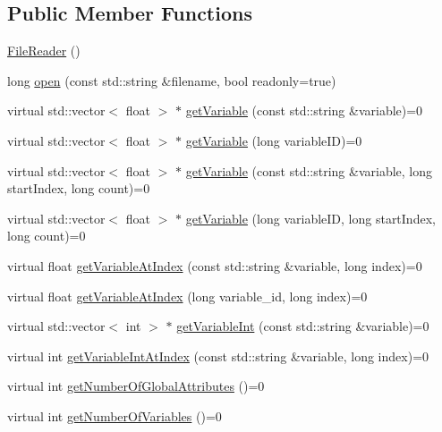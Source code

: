 \subsection*{Public Member Functions}
\begin{DoxyCompactItemize}
\item 
\hyperlink{classccmc_1_1_file_reader_a8d7df2b31965866393a4225e0955fcac}{File\-Reader} ()
\item 
long \hyperlink{classccmc_1_1_file_reader_aa7a02a3f99c09861a5e7c00e98b81be2}{open} (const std\-::string \&filename, bool readonly=true)
\item 
virtual std\-::vector$<$ float $>$ $\ast$ \hyperlink{classccmc_1_1_file_reader_a3703180de2d7d38c1ccf115d5279d4d0}{get\-Variable} (const std\-::string \&variable)=0
\item 
virtual std\-::vector$<$ float $>$ $\ast$ \hyperlink{classccmc_1_1_file_reader_a47fafa0e59e4d5f379a48b3d0b1add6e}{get\-Variable} (long variable\-I\-D)=0
\item 
virtual std\-::vector$<$ float $>$ $\ast$ \hyperlink{classccmc_1_1_file_reader_ac8e5796569d9e7df92d6f06edf4d1d79}{get\-Variable} (const std\-::string \&variable, long start\-Index, long count)=0
\item 
virtual std\-::vector$<$ float $>$ $\ast$ \hyperlink{classccmc_1_1_file_reader_a6c127caf47837d72fa46cf5f079399dd}{get\-Variable} (long variable\-I\-D, long start\-Index, long count)=0
\item 
virtual float \hyperlink{classccmc_1_1_file_reader_afb0680751b96215f3ba350b290b62f35}{get\-Variable\-At\-Index} (const std\-::string \&variable, long index)=0
\item 
virtual float \hyperlink{classccmc_1_1_file_reader_acfe13750b7afba1cb59925e6073f1731}{get\-Variable\-At\-Index} (long variable\-\_\-id, long index)=0
\item 
virtual std\-::vector$<$ int $>$ $\ast$ \hyperlink{classccmc_1_1_file_reader_ab8f4f917ca18681189e3ac8001282c34}{get\-Variable\-Int} (const std\-::string \&variable)=0
\item 
virtual int \hyperlink{classccmc_1_1_file_reader_a1ef9e0b43e1a3f051ceea507f00598f5}{get\-Variable\-Int\-At\-Index} (const std\-::string \&variable, long index)=0
\item 
virtual int \hyperlink{classccmc_1_1_file_reader_a006779f8e665219a7de5214f4d12f80f}{get\-Number\-Of\-Global\-Attributes} ()=0
\item 
virtual int \hyperlink{classccmc_1_1_file_reader_adf9f77e1e774cd1873648cde6ba0e479}{get\-Number\-Of\-Variables} ()=0

\end{DoxyCompactItemize}
